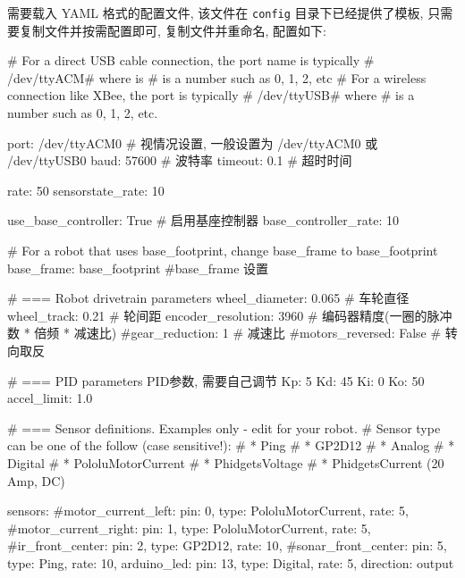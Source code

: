 \documentclass[openany, fontset=windowsold]{ctexbook}
\theoremstyle{kaiti}
\theoremstyle{normal}
\begin{document}

需要载入 YAML 格式的配置文件, 该文件在 \verb|config| 目录下已经提供了模板, 只需要复制文件并按需配置即可, 复制文件并重命名, 配置如下: 

\begin{bash}
  # For a direct USB cable connection, the port name is typically
  # /dev/ttyACM# where is # is a number such as 0, 1, 2, etc
  # For a wireless connection like XBee, the port is typically
  # /dev/ttyUSB# where # is a number such as 0, 1, 2, etc.

  port: /dev/ttyACM0 # 视情况设置, 一般设置为 /dev/ttyACM0 或 /dev/ttyUSB0
  baud: 57600 # 波特率
  timeout: 0.1 # 超时时间

  rate: 50
  sensorstate_rate: 10

  use_base_controller: True  # 启用基座控制器
  base_controller_rate: 10   

  # For a robot that uses base_footprint, change base_frame to base_footprint
  base_frame: base_footprint #base_frame 设置

  # === Robot drivetrain parameters
  wheel_diameter: 0.065 # 车轮直径
  wheel_track: 0.21 # 轮间距
  encoder_resolution: 3960 # 编码器精度(一圈的脉冲数 * 倍频 * 减速比)
  #gear_reduction: 1 # 减速比
  #motors_reversed: False # 转向取反

  # === PID parameters PID参数, 需要自己调节
  Kp: 5
  Kd: 45
  Ki: 0
  Ko: 50
  accel_limit: 1.0

  # === Sensor definitions.  Examples only - edit for your robot.
  #     Sensor type can be one of the follow (case sensitive!):
  #      * Ping
  #      * GP2D12
  #      * Analog
  #      * Digital
  #      * PololuMotorCurrent
  #      * PhidgetsVoltage
  #      * PhidgetsCurrent (20 Amp, DC)

  sensors: {
    #motor_current_left:   {pin: 0, type: PololuMotorCurrent, rate: 5},
    #motor_current_right:  {pin: 1, type: PololuMotorCurrent, rate: 5},
    #ir_front_center:      {pin: 2, type: GP2D12, rate: 10},
    #sonar_front_center:   {pin: 5, type: Ping, rate: 10},
    arduino_led:          {pin: 13, type: Digital, rate: 5, direction: output}
  }
\end{bash}
\end{document}
